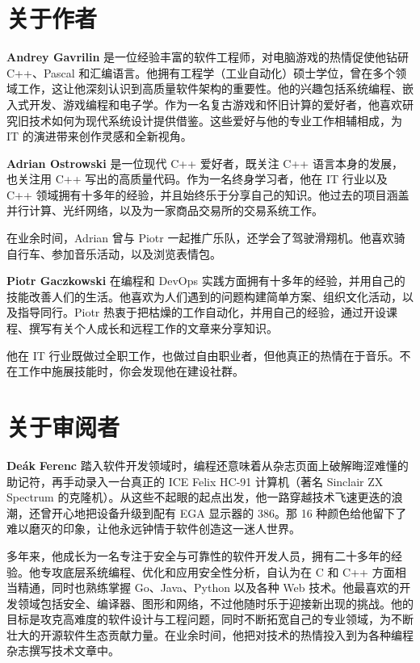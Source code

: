 \section*{关于作者}

\textbf{Andrey Gavrilin} 是一位经验丰富的软件工程师，对电脑游戏的热情促使他钻研 C++、Pascal 和汇编语言。他拥有工程学（工业自动化）硕士学位，曾在多个领域工作，这让他深刻认识到高质量软件架构的重要性。他的兴趣包括系统编程、嵌入式开发、游戏编程和电子学。作为一名复古游戏和怀旧计算的爱好者，他喜欢研究旧技术如何为现代系统设计提供借鉴。这些爱好与他的专业工作相辅相成，为 IT 的演进带来创作灵感和全新视角。

\textbf{Adrian Ostrowski} 是一位现代 C++ 爱好者，既关注 C++ 语言本身的发展，也关注用 C++ 写出的高质量代码。作为一名终身学习者，他在 IT 行业以及 C++ 领域拥有十多年的经验，并且始终乐于分享自己的知识。他过去的项目涵盖并行计算、光纤网络，以及为一家商品交易所的交易系统工作。

在业余时间，Adrian 曾与 Piotr 一起推广乐队，还学会了驾驶滑翔机。他喜欢骑自行车、参加音乐活动，以及浏览表情包。

\textbf{Piotr Gaczkowski} 在编程和 DevOps 实践方面拥有十多年的经验，并用自己的技能改善人们的生活。他喜欢为人们遇到的问题构建简单方案、组织文化活动，以及指导同行。Piotr 热衷于把枯燥的工作自动化，并用自己的经验，通过开设课程、撰写有关个人成长和远程工作的文章来分享知识。

他在 IT 行业既做过全职工作，也做过自由职业者，但他真正的热情在于音乐。不在工作中施展技能时，你会发现他在建设社群。

\section*{关于审阅者}

\textbf{Deák} \textbf{Ferenc} 踏入软件开发领域时，编程还意味着从杂志页面上破解晦涩难懂的助记符，再手动录入一台真正的 ICE Felix HC-91 计算机（著名 Sinclair ZX Spectrum 的克隆机）。从这些不起眼的起点出发，他一路穿越技术飞速更迭的浪潮，还曾开心地把设备升级到配有 EGA 显示器的 386。那 16 种颜色给他留下了难以磨灭的印象，让他永远钟情于软件创造这一迷人世界。

多年来，他成长为一名专注于安全与可靠性的软件开发人员，拥有二十多年的经验。他专攻底层系统编程、优化和应用安全性分析，自认为在 C 和 C++ 方面相当精通，同时也熟练掌握 Go、Java、Python 以及各种 Web 技术。他最喜欢的开发领域包括安全、编译器、图形和网络，不过他随时乐于迎接新出现的挑战。他的目标是攻克高难度的软件设计与工程问题，同时不断拓宽自己的专业领域，为不断壮大的开源软件生态贡献力量。在业余时间，他把对技术的热情投入到为各种编程杂志撰写技术文章中。

